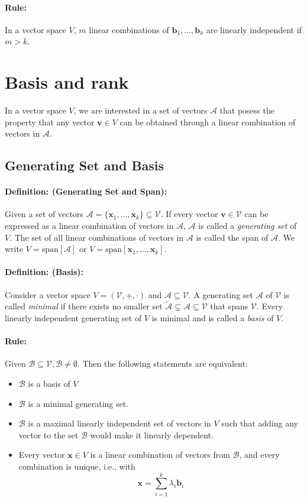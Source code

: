 \documentclass[12pt]{article}
\newcommand{\vecs}[2]{{\bm{#1}_1, \dots, \bm{#1}_#2}}
\newcommand{\xdefinition}[2]{\paragraph{\colorbox{#1!30}{\textbf{Definition:}} (#2):}}
\newcommand{\xrule}[1]{\paragraph{\colorbox{#1!30}{\textbf{Rule:}}}}
\newcommand{\mc}[1]{\mathcal{#1}}
\begin{document}
\xrule{blue} In a vector space $V$, $m$ linear combinations of $\vecs{b}{k}$ are linearly independent if $m > k$. 

\section{Basis and rank}

In a vector space $V$, we are interested in a set of vectors $\mathcal{A}$ that posess the property that any vector $\bm{v} \in V$ can be obtained through a linear combination of vectors in $\mathcal{A}$.

\subsection{Generating Set and Basis}

\xdefinition{blue}{Generating Set and Span} Given a set of vectors $\mc{A} = \{ \vecs{x}{k} \} \subseteq \mc{V}$. If every vector $\bm{v} \in \mc{V}$ can be expressed as a linear combination of vectors in $\mc{A}$, $\mc{A}$ is called a \textit{generating set} of $V$.	The set of all linear combinations of vectors in $\mc{A}$ is called the span of $\mc{A}$. We write $V = \text{span}[\mc{A}]$ or $V = \text{span}[\vecs{x}{k}]$.

\xdefinition{blue}{Basis} Consider a vector space $V = (\mc{V}, +, \cdot)$ and $\mc{A} \subseteq \mc{V}$. A generating set $\mc{A}$ of $\mc{V}$ is called \textit{minimal} if there exists no smaller set $\tilde{\mc{A}} \subsetneq \mc{A} \subseteq \mc{V}$ that spans $\mc{V}$. Every linearly independent generating set of $V$ is minimal and is called a \textit{basis} of $V$.

\xrule{blue} Given $\mc{B} \subseteq \mc{V}, \mc{B} \neq \emptyset$. Then the following statements are equivalent:
%
\begin{itemize}
	\item $\mc{B}$ is a basis of $V$
	\item $\mc{B}$ is a minimal generating set.
	\item $\mc{B}$ is a maximal linearly independent set of vectors in $V$ such that adding any vector to the set $\mc{B}$ would make it linearly dependent. 
	\item Every vector $\bm{x} \in V$ is a linear combination of vectors from $\mc{B}$, and every combination is unique, i.e., with
		\begin{equation}
			\bm{x} = \sum\limits_{i=1}^{k} \lambda_i \bm{b}_i
		\end{equation}
\end{itemize}
\end{document}
